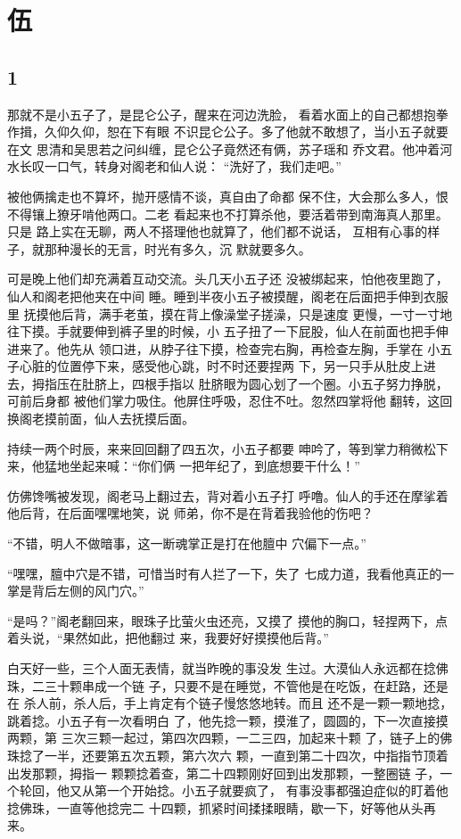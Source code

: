\section{伍}

{\centering\subsection{1}}

那就不是小五子了，是昆仑公子，醒来在河边洗脸，
看着水面上的自己都想抱拳作揖，久仰久仰，恕在下有眼
不识昆仑公子。多了他就不敢想了，当小五子就要在文
思清和吴思若之问纠缠，昆仑公子竟然还有俩，苏子瑶和
乔文君。他冲着河水长叹一口气，转身对阁老和仙人说：
“洗好了，我们走吧。”

被他俩擒走也不算坏，抛开感情不谈，真自由了命都
保不住，大会那么多人，恨不得镶上獠牙啃他两口。二老
看起来也不打算杀他，要活着带到南海真人那里。只是
路上实在无聊，两人不搭理他也就算了，他们都不说话，
互相有心事的样子，就那种漫长的无言，时光有多久，沉
默就要多久。

可是晚上他们却充满着互动交流。头几天小五子还
没被绑起来，怕他夜里跑了，仙人和阁老把他夹在中间
睡。睡到半夜小五子被摸醒，阁老在后面把手伸到衣服里
抚摸他后背，满手老茧，摸在背上像澡堂子搓澡，只是速度
更慢，一寸一寸地往下摸。手就要伸到裤子里的时候，小
五子扭了一下屁股，仙人在前面也把手伸进来了。他先从
领口进，从脖子往下摸，检查完右胸，再检查左胸，手掌在
小五子心脏的位置停下来，感受他心跳，时不时还要捏两
下，另一只手从肚皮上进去，拇指压在肚脐上，四根手指以
肚脐眼为圆心划了一个圈。小五子努力挣脱，可前后身都
被他们掌力吸住。他屏住呼吸，忍住不吐。忽然四掌将他
翻转，这回换阁老摸前面，仙人去抚摸后面。

持续一两个时辰，来来回回翻了四五次，小五子都要
呻吟了，等到掌力稍微松下来，他猛地坐起来喊：“你们俩
一把年纪了，到底想要干什么！”

仿佛馋嘴被发现，阁老马上翻过去，背对着小五子打
呼噜。仙人的手还在摩挲着他后背，在后面嘿嘿地笑，说
师弟，你不是在背着我验他的伤吧？

“不错，明人不做暗事，这一断魂掌正是打在他膻中
穴偏下一点。”

“嘿嘿，膻中穴是不错，可惜当时有人拦了一下，失了
七成力道，我看他真正的一掌是背后左侧的风门穴。”

“是吗？”阁老翻回来，眼珠子比萤火虫还亮，又摸了
摸他的胸口，轻捏两下，点着头说，“果然如此，把他翻过
来，我要好好摸摸他后背。”
\newline

白天好一些，三个人面无表情，就当昨晚的事没发
生过。大漠仙人永远都在捻佛珠，二三十颗串成一个链
子，只要不是在睡觉，不管他是在吃饭，在赶路，还是在
杀人前，杀人后，手上肯定有个链子慢悠悠地转。而且
还不是一颗一颗地捻，跳着捻。小五子有一次看明白
了，他先捻一颗，摸淮了，圆圆的，下一次直接摸两颗，第
三次三颗一起过，第四次四颗，一二三四，加起来十颗
了，链子上的佛珠捻了一半，还要第五次五颗，第六次六
颗，一直到第二十四次，中指指节顶着出发那颗，拇指一
颗颗捻着查，第二十四颗刚好回到出发那颗，一整圈链
子，一个轮回，他又从第一个开始捻。小五子就要疯了，
有事没事都强迫症似的盯着他捻佛珠，一直等他捻完二
十四颗，抓紧时间揉揉眼睛，歇一下，好等他从头再来。

